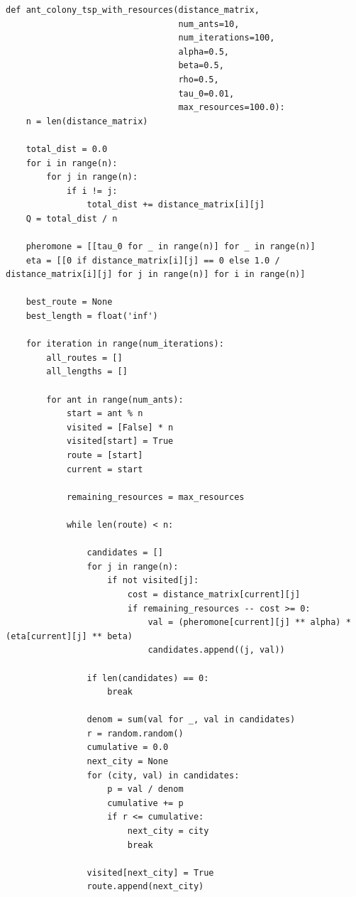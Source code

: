 \begin{lstlisting}[style=python, label=lst:ant,caption=Муравьиный алгоритм]
def ant_colony_tsp_with_resources(distance_matrix,
                                  num_ants=10,
                                  num_iterations=100,
                                  alpha=0.5,
                                  beta=0.5,
                                  rho=0.5,
                                  tau_0=0.01,
                                  max_resources=100.0):
    n = len(distance_matrix)

    total_dist = 0.0
    for i in range(n):
        for j in range(n):
            if i != j:
                total_dist += distance_matrix[i][j]
    Q = total_dist / n

    pheromone = [[tau_0 for _ in range(n)] for _ in range(n)]
    eta = [[0 if distance_matrix[i][j] == 0 else 1.0 / distance_matrix[i][j] for j in range(n)] for i in range(n)]

    best_route = None
    best_length = float('inf')

    for iteration in range(num_iterations):
        all_routes = []
        all_lengths = []

        for ant in range(num_ants):
            start = ant % n
            visited = [False] * n
            visited[start] = True
            route = [start]
            current = start

            remaining_resources = max_resources

            while len(route) < n:

                candidates = []
                for j in range(n):
                    if not visited[j]:
                        cost = distance_matrix[current][j]
                        if remaining_resources -- cost >= 0:
                            val = (pheromone[current][j] ** alpha) * (eta[current][j] ** beta)
                            candidates.append((j, val))

                if len(candidates) == 0:
                    break

                denom = sum(val for _, val in candidates)
                r = random.random()
                cumulative = 0.0
                next_city = None
                for (city, val) in candidates:
                    p = val / denom
                    cumulative += p
                    if r <= cumulative:
                        next_city = city
                        break

                visited[next_city] = True
                route.append(next_city)


\end{lstlisting}
